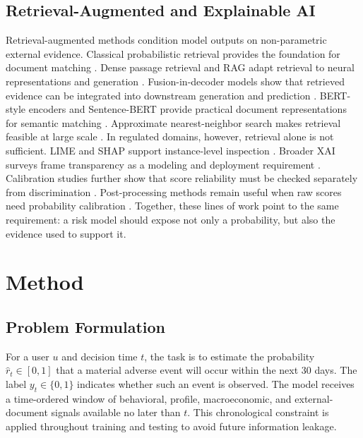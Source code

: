 \documentclass[runningheads]{llncs}
\begin{document}
\subsection{Retrieval-Augmented and Explainable AI}
Retrieval-augmented methods condition model outputs on non-parametric external evidence. Classical probabilistic retrieval provides the foundation for document matching \cite{robertson2009probabilistic}. Dense passage retrieval and RAG adapt retrieval to neural representations and generation \cite{karpukhin2020dpr,lewis2020rag}. Fusion-in-decoder models show that retrieved evidence can be integrated into downstream generation and prediction \cite{izacard2021leveraging}. BERT-style encoders and Sentence-BERT provide practical document representations for semantic matching \cite{devlin2019bert,reimers2019sentence}. Approximate nearest-neighbor search makes retrieval feasible at large scale \cite{malkov2020hnsw,johnson2019billion}. In regulated domains, however, retrieval alone is not sufficient. LIME and SHAP support instance-level inspection \cite{ribeiro2016lime,lundberg2017shap}. Broader XAI surveys frame transparency as a modeling and deployment requirement \cite{guidotti2018survey,arrieta2020explainable}. Calibration studies further show that score reliability must be checked separately from discrimination \cite{guo2017calibration,niculescu2005predicting}. Post-processing methods remain useful when raw scores need probability calibration \cite{zadrozny2002transforming}. Together, these lines of work point to the same requirement: a risk model should expose not only a probability, but also the evidence used to support it.

\section{Method}
\label{sec:method}

\subsection{Problem Formulation}
For a user $u$ and decision time $t$, the task is to estimate the probability $\hat{r}_t \in [0,1]$ that a material adverse event will occur within the next 30 days. The label $y_t \in \{0,1\}$ indicates whether such an event is observed. The model receives a time-ordered window of behavioral, profile, macroeconomic, and external-document signals available no later than $t$. This chronological constraint is applied throughout training and testing to avoid future information leakage.
\end{document}
